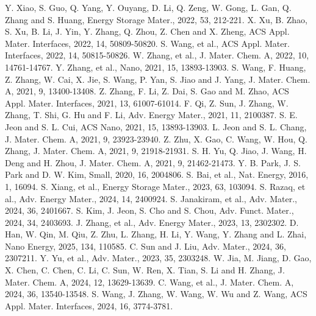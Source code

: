 \documentclass[12pt,a4paper,twocolumn]{article} %
\newcommand{\english}[1]{\textenglish{#1}}
\begin{document}
 \english{Y. Xiao, S. Guo, Q. Yang, Y. Ouyang, D. Li, Q. Zeng, W. Gong, L. Gan, Q. Zhang and S. Huang, Energy Storage Mater., 2022, 53, 212-221.}
 \english{X. Xu, B. Zhao, S. Xu, B. Li, J. Yin, Y. Zhang, Q. Zhou, Z. Chen and X. Zheng, ACS Appl. Mater. Interfaces, 2022, 14, 50809-50820.}
 \english{S. Wang, et al., ACS Appl. Mater. Interfaces, 2022, 14, 50815-50826.}
 \english{W. Zhang, et al., J. Mater. Chem. A, 2022, 10, 14761-14767.}
 \english{Y. Zhang, et al., Nano, 2021, 15, 13893-13903.}
 \english{S. Wang, F. Huang, Z. Zhang, W. Cai, X. Jie, S. Wang, P. Yan, S. Jiao and J. Yang, J. Mater. Chem. A, 2021, 9, 13400-13408.}
 \english{Z. Zhang, F. Li, Z. Dai, S. Gao and M. Zhao, ACS Appl. Mater. Interfaces, 2021, 13, 61007-61014.}
 \english{F. Qi, Z. Sun, J. Zhang, W. Zhang, T. Shi, G. Hu and F. Li, Adv. Energy Mater., 2021, 11, 2100387.}
 \english{S. E. Jeon and S. L. Cui, ACS Nano, 2021, 15, 13893-13903.}
 \english{L. Jeon and S. L. Chang, J. Mater. Chem. A, 2021, 9, 23923-23940.}
 \english{Z. Zhu, X. Gao, C. Wang, W. Hou, Q. Zhang, J. Mater. Chem. A, 2021, 9, 21918-21931.}
 \english{S. H. Yu, Q. Jiao, J. Wang, H. Deng and H. Zhou, J. Mater. Chem. A, 2021, 9, 21462-21473.}
 \english{Y. B. Park, J. S. Park and D. W. Kim, Small, 2020, 16, 2004806.}
 \english{S. Bai, et al., Nat. Energy, 2016, 1, 16094.}
 \english{S. Xiang, et al., Energy Storage Mater., 2023, 63, 103094.}
 \english{S. Razaq, et al., Adv. Energy Mater., 2024, 14, 2400924.}
 \english{S. Janakiram, et al., Adv. Mater., 2024, 36, 2401667.}
 \english{S. Kim, J. Jeon, S. Cho and S. Chou, Adv. Funct. Mater., 2024, 34, 2403693.}
 \english{J. Zhang, et al., Adv. Energy Mater., 2023, 13, 2302302.}
 \english{D. Han, W. Qin, M. Qiu, Z. Zhu, L. Zhang, H. Li, Y. Wang, Y. Zhang and L. Zhai, Nano Energy, 2025, 134, 110585.}
 \english{C. Sun and J. Liu, Adv. Mater., 2024, 36, 2307211.}
 \english{Y. Yu, et al., Adv. Mater., 2023, 35, 2303248.}
 \english{W. Jia, M. Jiang, D. Gao, X. Chen, C. Chen, C. Li, C. Sun, W. Ren, X. Tian, S. Li and H. Zhang, J. Mater. Chem. A, 2024, 12, 13629-13639.}
 \english{C. Wang, et al., J. Mater. Chem. A, 2024, 36, 13540-13548.}
 \english{S. Wang, J. Zhang, W. Wang, W. Wu and Z. Wang, ACS Appl. Mater. Interfaces, 2024, 16, 3774-3781.}
\end{document}
